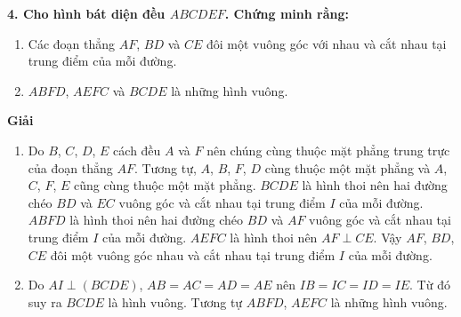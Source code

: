 \documentclass[12pt]{article}
\begin{document}
\noindent
\textbf{4. Cho hình bát diện đều $ABCDEF$. Chứng minh rằng:}
\begin{enumerate}[label=(\alph*)]
    \item Các đoạn thẳng $AF$, $BD$ và $CE$ đôi một vuông góc với nhau và cắt nhau tại trung điểm của mỗi đường.
    \item $ABFD$, $AEFC$ và $BCDE$ là những hình vuông.
\end{enumerate}

\begin{center}
\end{center}

\noindent
\textbf{Giải}
\begin{enumerate}[label=(\alph*)]
    \item Do $B$, $C$, $D$, $E$ cách đều $A$ và $F$ nên chúng cùng thuộc mặt phẳng trung trực của đoạn thẳng $AF$. Tương tự, $A$, $B$, $F$, $D$ cùng thuộc một mặt phẳng và $A$, $C$, $F$, $E$ cũng cùng thuộc một mặt phẳng. $BCDE$ là hình thoi nên hai đường chéo $BD$ và $EC$ vuông góc và cắt nhau tại trung điểm $I$ của mỗi đường. $ABFD$ là hình thoi nên hai đường chéo $BD$ và $AF$ vuông góc và cắt nhau tại trung điểm $I$ của mỗi đường. $AEFC$ là hình thoi nên $AF \perp CE$. Vậy $AF$, $BD$, $CE$ đôi một vuông góc nhau và cắt nhau tại trung điểm $I$ của mỗi đường.
    \item Do $AI \perp (BCDE)$, $AB = AC = AD = AE$ nên $IB = IC = ID = IE$. Từ đó suy ra $BCDE$ là hình vuông. Tương tự $ABFD$, $AEFC$ là những hình vuông.
\end{enumerate}
\end{document}
